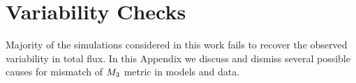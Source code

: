 \section{Variability Checks}\label{app:variability}


Majority of the simulations considered in this work fails to recover the \sgra observed variability in total flux.
In this Appendix we discuss and dismiss several possible causes for mismatch of $M_{3}$ metric in models and data.













